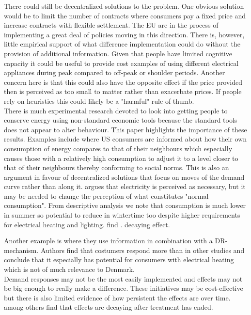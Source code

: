 There could still be decentralized solutions to the problem. One obvious solution would be to limit the number of contracts where consumers pay a fixed price and increase contracts with flexible settlement. The EU are in the process of implementing a great deal of policies moving in this direction. There is, however, little empirical support of what difference implementation could do without the provision of additional information. Given that people have limited cognitive capacity it could be useful to provide cost examples of using different electrical appliances during peak compared to off-peak or shoulder periods.
Another concern here is that this could also have the opposite effect if the price provided then is perceived as too small to matter rather than exacerbate prices. If people rely on heuristics this could likely be a "harmful" rule of thumb.
\smallskip \\

There is much experimental research devoted to look into getting people to conserve energy using non-standard economic tools because the standard tools does not appear to alter behaviour. This paper highlights the importance of these results. Examples include \cite{allcott2011social} where US consumers are informed about how their own consumption of energy compares to that of their neighbours which especially causes those with a relatively high consumption to adjust it to a level closer to that of their neighbours thereby conforming to social norms. This is also an argument in favour of decentralized solutions that focus on moves of the demand curve rather than along it. \cite{kirschen2003demand} argues that electricity is perceived as necessary, but it may be needed to change the perception of what constitutes "normal consumption". From descriptive analysis we note that consumption is much lower in summer so potential to reduce in wintertime too despite higher requirements for electrical heating and lighting.
\cite{allcott2014short} find . decaying effect.


Another example is \citep{saele2011demand} where they use information in combination with a DR-mechanism. Authors find that costumers respond more than in other studies and conclude that it especially has potential for consumers with electrical heating which is not of much relevance to Denmark.\smallskip \\

Demand responses may not be the most easily implemented and effects may not be big enough to really make a difference. These initiatives may be cost-effective but there is also limited evidence of how persistent the effects are over time. \cite{allcott2014short} among others find that effects are decaying after treatment has ended. \smallskip \\


